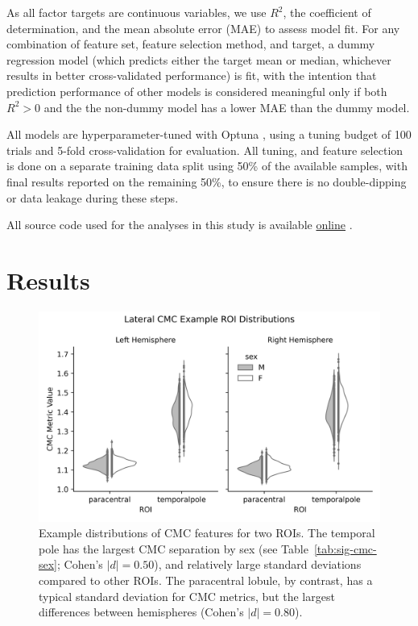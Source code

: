 \documentclass{article}
\begin{document}
As all factor targets are continuous variables, we use \(R^2\), the
coefficient of determination, and the mean absolute error (MAE) to assess
model fit. For any combination of feature set, feature selection method, and
target, a dummy regression model (which predicts either the target mean or
median, whichever results in better cross-validated performance) is fit, with
the intention that prediction performance of other models is considered
meaningful only if both \(R^2 > 0\) and the the non-dummy model has a lower MAE
than the dummy model.

All models are hyperparameter-tuned with Optuna \citep{Optuna2019}, using a
tuning budget of 100 trials and 5-fold cross-validation for evaluation. All
tuning, and feature selection is done on a separate training data split using
50\% of the available samples, with final results reported on the remaining
50\%, to ensure there is no double-dipping or data leakage during these
steps.

All source code used for the analyses in this study is available
\href{https://github.com/stfxecutables/cortical_congruence}{online}
\citep{dm-bergerStfxecutablesCortical_congruenceInit2024}.


\section{Results}


\begin{figure}
	\centering
	\includegraphics[width=6.5in]{figures/example_violins.png}
	\caption{Example distributions of CMC features for two ROIs. The temporal
	pole has the largest CMC separation by sex (see
	Table~\ref{tab:sig-cmc-sex}; Cohen's \(|d|=0.50\)), and relatively large
	standard deviations compared to other ROIs. The paracentral lobule, by
	contrast, has a typical standard deviation for CMC metrics, but the largest
	differences between hemispheres (Cohen's \(|d|=0.80\)).}
	\label{fig:violins}
\end{figure}
\end{document}
